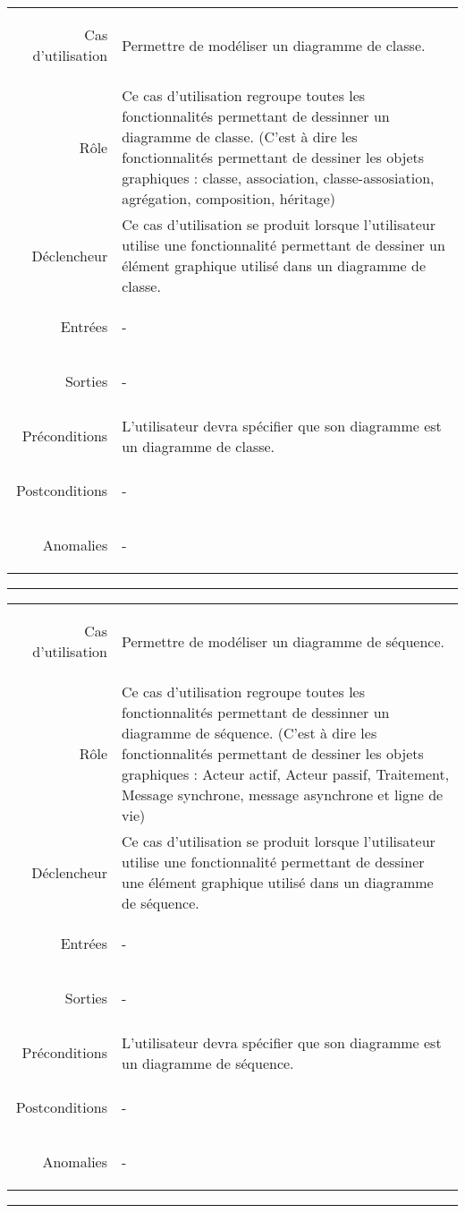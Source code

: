 \documentclass[12pt,a4paper,openany]{report}
\newcommand{\separateur}{\begin{center}\rule{12.6cm}{.5pt}\end{center}}
\begin{document}
	\begin{longtable}{>{\begin{bf}} r <{\end{bf}}!{:}p{13.5cm}}
	Cas d'utilisation & Permettre de modéliser un diagramme de classe.\\
	Rôle & Ce cas d'utilisation regroupe toutes les fonctionnalités permettant de dessinner un diagramme de classe.
	(C'est à dire les fonctionnalités permettant de dessiner les objets graphiques : classe, association, classe-assosiation,
	agrégation, composition, héritage) \\
	Déclencheur & Ce cas d'utilisation se produit lorsque l'utilisateur utilise une fonctionnalité permettant de dessiner un
	élément graphique utilisé dans un diagramme de classe.\\
	Entrées & -\\
	Sorties & -\\
	Préconditions & L'utilisateur devra spécifier que son diagramme est un diagramme de classe.\\
	Postconditions & -\\
	Anomalies & -\\
	\end{longtable}
		\separateur
	\begin{longtable}{>{\begin{bf}} r <{\end{bf}}!{:}p{13.5cm}}
	Cas d'utilisation & Permettre de modéliser un diagramme de séquence.\\
	Rôle & Ce cas d'utilisation regroupe toutes les fonctionnalités permettant de dessinner un diagramme de séquence.
	(C'est à dire les fonctionnalités permettant de dessiner les objets graphiques : Acteur actif, Acteur passif, Traitement,
	Message synchrone, message asynchrone et ligne de vie)\\
	Déclencheur & Ce cas d'utilisation se produit lorsque l'utilisateur utilise une fonctionnalité permettant de dessiner une élément
	graphique utilisé dans un diagramme de séquence.\\
	Entrées & -\\
	Sorties & -\\
	Préconditions & L'utilisateur devra spécifier que son diagramme est un diagramme de séquence. \\
	Postconditions & -\\
	Anomalies & -\\
	\end{longtable}
	\separateur
\end{document}
